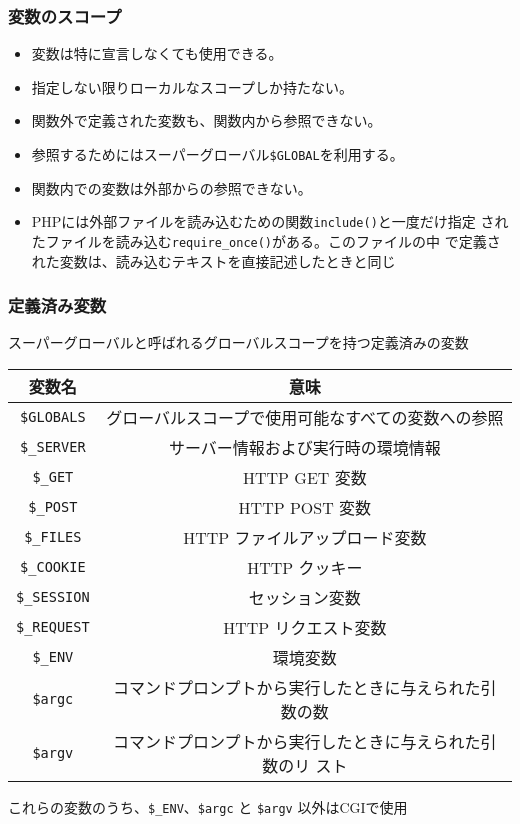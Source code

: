 \begin{frame}[containsverbatim]
\frametitle{変数のスコープ}
\begin{itemize}
 \item 変数は特に宣言しなくても使用できる。
 \item 指定しない限りローカルなスコープしか持たない。
 \item 関数外で定義された変数も、関数内から参照できない。
 \item 参照するためにはスーパーグローバル\verb+$GLOBAL+を利用する。
 \item 関数内での変数は外部からの参照できない。
 \item PHPには外部ファイルを読み込むための関数\texttt{include()}と一度だけ指定
されたファイルを読み込む\texttt{require\_once()}がある。このファイルの中
で定義された変数は、読み込むテキストを直接記述したときと同じ
\end{itemize}
\end{frame}
\begin{frame}[containsverbatim]
\frametitle{定義済み変数}
スーパーグローバルと呼ばれるグローバルスコープを持つ定義済みの変数
\begin{center}\small
 \begin{tabular}{|c|c|}\hline
  変数名& 意味\\\hline
\verb+$GLOBALS+ & グローバルスコープで使用可能なすべての変数への参照\\\hline
\verb+$_SERVER+ & サーバー情報および実行時の環境情報\\\hline
\verb+$_GET+ & HTTP GET 変数\\\hline
\verb+$_POST+ & HTTP POST 変数\\\hline
\verb+$_FILES+ & HTTP ファイルアップロード変数\\\hline
\verb+$_COOKIE+ & HTTP クッキー\\\hline
\verb+$_SESSION+ &セッション変数 \\\hline
\verb+$_REQUEST+ & HTTP リクエスト変数\\\hline
\verb+$_ENV+  &  環境変数\\\hline
\verb+$argc+  &  コマンドプロンプトから実行したときに与えられた引数の数\\\hline
\verb+$argv+  &  コマンドプロンプトから実行したときに与えられた引数のリ
      スト\\\hline
\end{tabular}
\end{center}
これらの変数のうち、\verb+$_ENV+、\verb+$argc+ と
\verb+$argv+  以外はCGIで使用
\end{frame}
